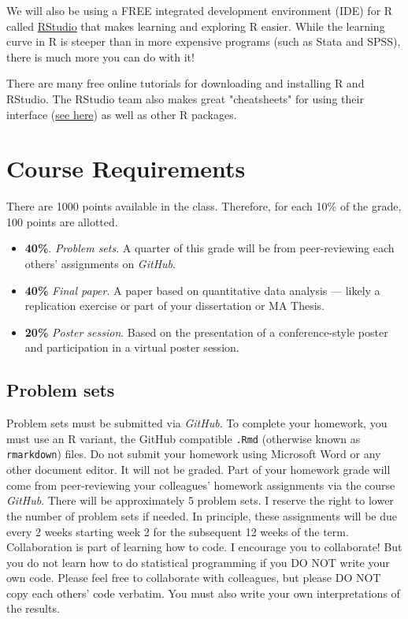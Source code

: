\documentclass[11pt]{article}
\begin{document}
We will also be using a FREE integrated development environment (IDE) for R called \href{https://rstudio.com/}{RStudio} that makes learning and exploring R easier. While the learning curve in R is steeper than in more expensive programs (such as Stata and SPSS), there is much more you can do with it!

There are many free online tutorials for downloading and installing R and RStudio. The RStudio team also makes great "cheatsheets" for using their interface (\href{https://github.com/rstudio/cheatsheets/raw/master/rstudio-ide.pdf}{see here}) as well as other R packages.


\section{Course Requirements}

There are 1000 points available in the class. Therefore, for each 10\%
of the grade, 100 points are allotted.

\begin{itemize}
\item
  \textbf{40\%}. \emph{Problem sets}. A quarter of this grade will be
  from peer-reviewing each others' assignments on \emph{GitHub}.
\item
  \textbf{40\%} \emph{Final paper}. A paper based on quantitative data analysis --- likely a replication
  exercise or part of your dissertation or MA Thesis.
  \item
  \textbf{20\%} \emph{Poster session}. Based on the presentation of a conference-style poster and participation in a virtual poster session.
\end{itemize}

\subsection*{Problem sets}

Problem sets must be submitted via \emph{GitHub}. To complete your homework, you must use an R variant, the GitHub compatible \texttt{.Rmd} (otherwise known as \texttt{rmarkdown}) files. Do not submit your homework using Microsoft Word or any other document editor. It will not be graded. Part
of your homework grade will come from peer-reviewing your colleagues' homework
assignments via the course \emph{GitHub}. There will be approximately 5
problem sets. I reserve the right to lower the number of problem sets if
needed. In principle, these assignments will be due every 2 weeks
starting week 2 for the subsequent 12 weeks of the term. Collaboration
is part of learning how to code. I encourage you to collaborate! But you
do not learn how to do statistical programming if you DO NOT write your
own code. Please feel free to collaborate with colleagues, but please DO
NOT copy each others' code verbatim. You must also write your own
interpretations of the results.
\end{document}
